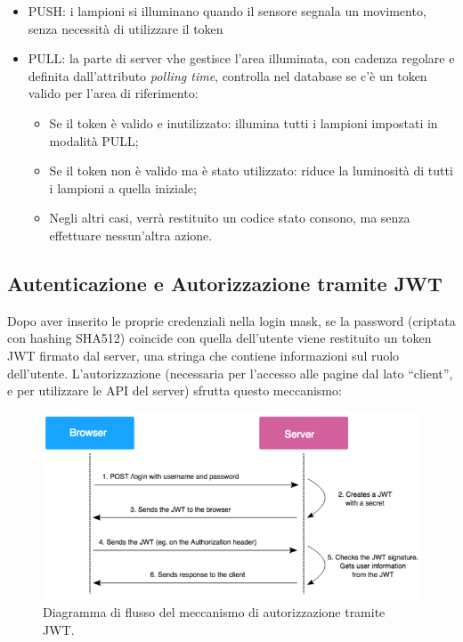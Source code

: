 \documentclass[a4paper, 11pt]{article}
\begin{document}
\begin{itemize}
    \item PUSH: i lampioni si illuminano quando il sensore segnala un movimento, senza necessità di utilizzare il token
    \item PULL: la parte di server vhe gestisce l'area illuminata, con cadenza regolare e definita dall'attributo \textit{polling time}, controlla nel database se c'è un token valido per l'area di riferimento:
          \begin{itemize}
              \item Se il token è valido e inutilizzato: illumina tutti i lampioni impostati in modalità PULL;
              \item Se il token non è valido ma è stato utilizzato: riduce la luminosità di tutti i lampioni a quella iniziale;
              \item Negli altri casi, verrà restituito un codice stato consono, ma senza effettuare nessun'altra azione.
          \end{itemize}
\end{itemize}

\subsection{Autenticazione e Autorizzazione tramite JWT}
Dopo aver inserito le proprie credenziali nella login mask, se la password (criptata con hashing SHA512) coincide con quella dell'utente viene restituito un token JWT firmato dal server, una stringa che contiene informazioni sul ruolo dell'utente. L'autorizzazione (necessaria per l'accesso alle pagine dal lato “client”, e per utilizzare le API del server) sfrutta questo meccanismo:
\begin{figure}[H]
    \centering
    \includegraphics[width=\textwidth]{auth}
    \caption{Diagramma di flusso del meccanismo di autorizzazione tramite JWT.}
\end{figure}
\end{document}
